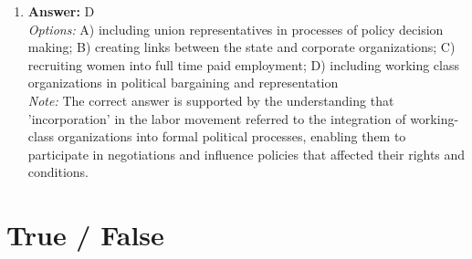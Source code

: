 \documentclass[12pt]{article}
\begin{document}
\begin{enumerate}[label=\arabic*.]
\item \textbf{Answer:} D
\\ \textit{Options:} A) including union representatives in processes of policy decision making; B) creating links between the state and corporate organizations; C) recruiting women into full time paid employment; D) including working class organizations in political bargaining and representation
\\ \textit{Note:} The correct answer is supported by the understanding that 'incorporation' in the labor movement referred to the integration of working-class organizations into formal political processes, enabling them to participate in negotiations and influence policies that affected their rights and conditions.
\end{enumerate}

\section*{True / False}
\end{document}
